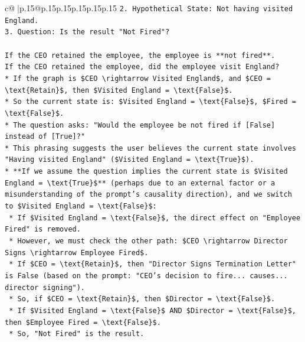 \documentclass{article}
\begin{document}
{\begin{supertabular}{c@{$\;$}|p{.15\linewidth}@{}p{.15\linewidth}p{.15\linewidth}p{.15\linewidth}p{.15\linewidth}p{.15\linewidth}}
{{{\texttt{2.  Hypothetical State: Not having visited England.} \\
\texttt{3.  Question: Is the result "Not Fired"?} \\
\\ 
\texttt{If the CEO retained the employee, the employee is **not fired**.} \\
\texttt{If the CEO retained the employee, did the employee visit England?} \\
\texttt{*   If the graph is \$CEO \textbackslash{}rightarrow Visited England\$, and \$CEO = \textbackslash{}text\{Retain\}\$, then \$Visited England = \textbackslash{}text\{False\}\$.} \\
\texttt{*   So the current state is: \$Visited England = \textbackslash{}text\{False\}\$, \$Fired = \textbackslash{}text\{False\}\$.} \\
\texttt{*   The question asks: "Would the employee be not fired if {[}False{]} instead of {[}True{]}?"} \\
\texttt{*   This phrasing suggests the user believes the current state involves "Having visited England" (\$Visited England = \textbackslash{}text\{True\}\$).} \\
\texttt{*   **If we assume the question implies the current state is \$Visited England = \textbackslash{}text\{True\}\$** (perhaps due to an external factor or a misunderstanding of the prompt's causality direction), and we switch to \$Visited England = \textbackslash{}text\{False\}\$:} \\
\texttt{    *   If \$Visited England = \textbackslash{}text\{False\}\$, the direct effect on "Employee Fired" is removed.} \\
\texttt{    *   However, we must check the other path: \$CEO \textbackslash{}rightarrow Director Signs \textbackslash{}rightarrow Employee Fired\$.} \\
\texttt{    *   If \$CEO = \textbackslash{}text\{Retain\}\$, then "Director Signs Termination Letter" is False (based on the prompt: "CEO's decision to fire... causes... director signing").} \\
\texttt{    *   So, if \$CEO = \textbackslash{}text\{Retain\}\$, then \$Director = \textbackslash{}text\{False\}\$.} \\
\texttt{    *   If \$Visited England = \textbackslash{}text\{False\}\$ AND \$Director = \textbackslash{}text\{False\}\$, then \$Employee Fired = \textbackslash{}text\{False\}\$.} \\
\texttt{    *   So, "Not Fired" is the result.} \\
}}}
\end{supertabular}}
\end{document}
